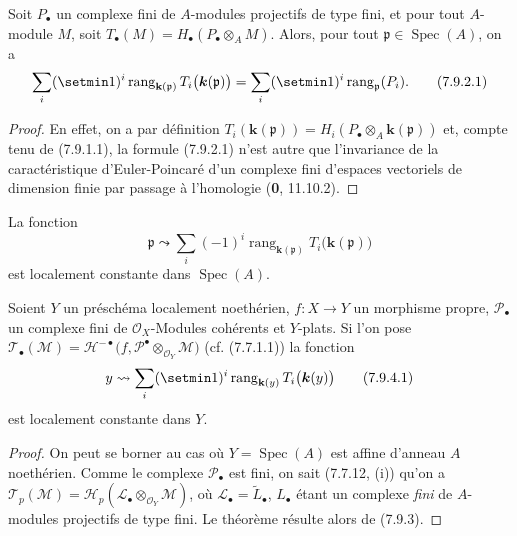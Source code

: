 \begin{proposition}[7.9.2]
\label{III.7.9.2.fr}
Soit $P_\bullet$ un complexe fini de $A$-modules projectifs de type fini, et
pour tout $A$-module $M$, soit
$T_\bullet(M)=H_\bullet(P_\bullet\otimes_A M)$. Alors, pour tout
$\mathfrak p\in\operatorname{Spec}(A)$, on a
\[
  \sum_i(\setmin 1)^i\operatorname{rang}_{\mathbf{k}(\mathfrak p)}
  T_i\bigl(\boldsymbol{k}(\mathfrak p)\bigr)
  =\sum_i(\setmin 1)^i\operatorname{rang}_{\mathfrak p}(P_i).
  \tag{7.9.2.1}\label{III.7.9.2.1.fr}
\]
\end{proposition}

\begin{proof}
En effet, on a par définition
$T_i(\boldsymbol{k}(\mathfrak p))=H_i(P_\bullet\otimes_A\boldsymbol{k}(\mathfrak p))$ et,
compte tenu de (7.9.1.1), la formule (7.9.2.1) n'est autre que l'invariance de
la caractéristique d'Euler-Poincaré d'un complexe fini d'espaces vectoriels de
dimension finie par passage à l'homologie (\textbf{0}, 11.10.2).
\end{proof}

\begin{corollary}[7.9.3]
\label{III.7.9.3.fr}
La fonction
\[
  \mathfrak p\leadsto
  \sum_i(-1)^i\operatorname{rang}_{\mathbf{k}(\mathfrak p)}
  T_i\bigl(\boldsymbol{k}(\mathfrak p)\bigr)
\]
est localement constante dans $\operatorname{Spec}(A)$.
\end{corollary}

\begin{theorem}[7.9.4]
\label{III.7.9.4.fr}
Soient $Y$ un préschéma localement noethérien, $f:X\to Y$ un morphisme propre,
$\mathscr P_\bullet$ un complexe fini de $\mathscr O_X$-Modules cohérents et
$Y$-plats. Si l'on pose
$\mathscr T_\bullet(\mathscr M)
  =\mathscr H^{-\bullet}
  \bigl(f,\mathscr P^\bullet\otimes_{\mathscr O_Y}\mathscr M\bigr)$ \textup{(cf. (7.7.1.1))}
la fonction
\[
  y\leadsto
  \sum_i(\setmin 1)^i\operatorname{rang}_{\mathbf{k}(y)}
  T_i\bigl(\boldsymbol{k}(y)\bigr)
  \tag{7.9.4.1}\label{III.7.9.4.1.fr}
\]
est localement constante dans $Y$.
\end{theorem}

\begin{proof}
On peut se borner au cas où $Y=\operatorname{Spec}(A)$ est affine d'anneau $A$
noethérien. Comme le complexe $\mathscr P_\bullet$ est fini, on sait (7.7.12,
(i)) qu'on a
$\mathscr T_p(\mathscr M)=\mathscr H_p(\mathscr L_\bullet\otimes_{\mathscr O_Y}\mathscr M)$, où
$\mathscr L_\bullet=\widetilde{L}_\bullet$,
$L_\bullet$ étant un complexe \emph{fini} de $A$-modules projectifs de type
fini. Le théorème résulte alors de (7.9.3).
\end{proof}

